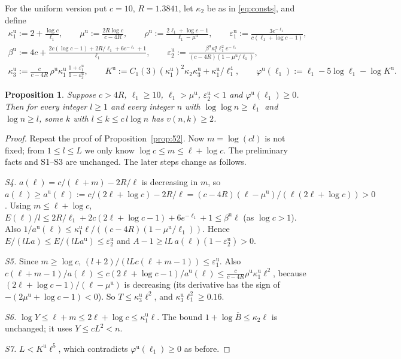 \documentclass[10pt]{article}
\numberwithin{equation}{section}
\newtheorem{proposition}[theorem]{Proposition}
\theoremstyle{definition}
\theoremstyle{plain}
\newcommand{\Bbar}{\overline{B}}
\newcommand{\unif}{\mathrm{u}}
\newcommand{\eps}{\varepsilon}
\begin{document}
For the uniform version put $c=10$, $R=1.3841$, let $\kappa_2$ be as in \eqref{eq:consts}, and define
\begin{equation}\label{eq:unif}
\begin{gathered}
\kappa_1^\unif:=2+\frac{\log c}{\ell_1},\qquad \mu^\unif:=\frac{2R\log c}{c-4R},\qquad
\rho^\unif:=\frac{2\ell_1+\log c-1}{\ell_1-\mu^\unif},\qquad \eps_1^\unif:=\frac{3e^{-\ell_1}}{c(\ell_1+\log c-1)},\\
\beta^\unif:=4c+\frac{2c(\log c-1)+2R/\ell_1+6e^{-\ell_1}+1}{\ell_1},\qquad
\eps_2^\unif:=\frac{\beta^\unif\kappa_1^\unif\ell_1^2e^{-\ell_1}}{(c-4R)(1-\mu^\unif/\ell_1)},\\
\kappa_3^\unif:=\frac{c}{c-4R}\,\rho^\unif\kappa_1^\unif\,\frac{1+\eps_1^\unif}{1-\eps_2^\unif},\qquad
K^\unif:=C_1(3)(\kappa_1^\unif)^2\kappa_2\kappa_3^\unif+\kappa_1^\unif/\ell_1^4,\qquad
\varphi^\unif(\ell_1):=\ell_1-5\log\ell_1-\log K^\unif.
\end{gathered}
\end{equation}

\begin{proposition}\label{prop:unif}
Suppose $c>4R$, $\ell_1\ge10$, $\ell_1>\mu^\unif$, $\eps_2^\unif<1$ and $\varphi^\unif(\ell_1)\ge0$. Then for every
integer $l\ge1$ and every integer $n$ with $\log\log n\ge\ell_1$ and $\log n\ge l$, some $k$ with
$l\le k\le c\,l\log n$ has $v(n,k)\ge2$.
\end{proposition}

\begin{proof}
Repeat the proof of Proposition~\ref{prop:52}. Now $m=\log(cl)$ is not fixed; from $1\le l\le L$ we only know
$\log c\le m\le\ell+\log c$. The preliminary facts and S1--S3 are unchanged. The later steps change as follows.

\emph{S4.} $a(\ell)=c/(\ell+m)-2R/\ell$ is decreasing in $m$, so
$a(\ell)\ge a^\unif(\ell):=c/(2\ell+\log c)-2R/\ell=(c-4R)(\ell-\mu^\unif)/(\ell(2\ell+\log c))>0$. Using
$m\le\ell+\log c$, $E(\ell)/l\le2R/\ell_1+2c(2\ell+\log c-1)+6e^{-\ell_1}+1\le\beta^\unif\ell$ (as $\log c>1$).
Also $1/a^\unif(\ell)\le\kappa_1^\unif\ell/((c-4R)(1-\mu^\unif/\ell_1))$. Hence
$E/(lLa)\le E/(lLa^\unif)\le\eps_2^\unif$ and $A-1\ge lL\,a(\ell)(1-\eps_2^\unif)>0$.

\emph{S5.} Since $m\ge\log c$, $(l+2)/(lLc(\ell+m-1))\le\eps_1^\unif$. Also
$c(\ell+m-1)/a(\ell)\le c(2\ell+\log c-1)/a^\unif(\ell)\le\frac{c}{c-4R}\rho^\unif\kappa_1^\unif\ell^2$, because
$(2\ell+\log c-1)/(\ell-\mu^\unif)$ is decreasing (its derivative has the sign of $-(2\mu^\unif+\log c-1)<0$).
So $T\le\kappa_3^\unif\ell^2$, and $\kappa_3^\unif\ell_1^2\ge0.16$.

\emph{S6.} $\log Y\le\ell+m\le2\ell+\log c\le\kappa_1^\unif\ell$. The bound $1+\log\Bbar\le\kappa_2\ell$ is
unchanged; it uses $Y\le cL^2<n$.

\emph{S7.} $L<K^\unif\ell^5$, which contradicts $\varphi^\unif(\ell_1)\ge0$ as before.
\end{proof}
\end{document}
